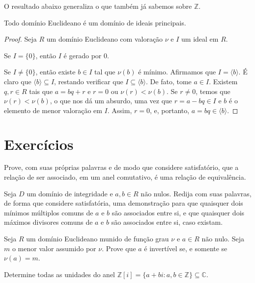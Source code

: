 O resultado abaixo generaliza o que também já sabemos sobre $\mathbb Z$.
\begin{prop}
Todo domínio Euclideano é um domínio de ideais principais.
\end{prop}
\begin{proof}
    Seja $R$ um domínio Euclideano com valoração $\nu$ e $I$ um ideal em $R$.

    Se $I=\{0\}$, então $I$ é gerado por $0$.

    Se $I\neq \{0\}$, então existe $b\in I$ tal que $\nu(b)$ é mínimo.
    Afirmamos que $I=\langle b\rangle$.
    É claro que $\langle b\rangle\subseteq I$, restando verificar que $I\subseteq \langle b\rangle$.
    De fato, tome $a \in I$.
    Existem $q, r \in R$ tais que $a=bq+r$ e $r=0$ ou $\nu(r)<\nu(b)$.
    Se $r\neq 0$, temos que $\nu(r)<\nu(b)$, o que nos dá um absurdo, uma vez que $r=a-bq\in I$ e $b$ é o elemento de menor valoração em $I$.
    Assim, $r=0$, e, portanto, $a=bq\in \langle b\rangle$.
\end{proof}





\section{Exercícios}

\begin{exer}
    Prove, com suas próprias palavras e de modo que considere satisfatório, que a relação de ser associado, em um anel comutativo, é uma relação de equivalência.
\end{exer}

\begin{exer}
    Seja $D$ um domínio de integridade e $a, b \in R$ não nulos.
    Redija com suas palavras, de forma que considere satisfatória, uma demonstração para que quaisquer dois mínimos múltiplos comuns de $a$ e $b$ são associados entre si, e que quaisquer dois máximos divisores comuns de $a$ e $b$ são associados entre si, caso existam.
\end{exer}
\begin{exer}
    Seja $R$ um domínio Euclideano munido de função grau $\nu$ e $a \in R$ não nulo.
    Seja $m$ o menor valor assumido por $\nu$.
    Prove que $a$ é invertível se, e somente se $\nu(a)=m$.
\end{exer}

\begin{exer}
    Determine todas as unidades do anel $\mathbb Z[i]=\{a+bi: a, b \in \mathbb Z\}\subseteq \mathbb C$.
\end{exer}

